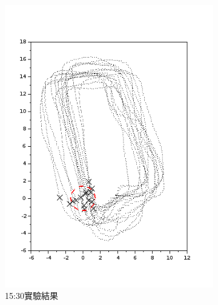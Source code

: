 \begin{figure}[h!]
\begin{subfigure}[t]{0.32\textwidth}
		\includegraphics[width=\textwidth]{figures/appendix1/dynamic_5}
		\caption{15:30實驗結果}
		\label{f:app:dynamic_5}
	\end{subfigure}
	\begin{subfigure}[t]{0.32\textwidth}

\end{subfigure}
\end{figure}
